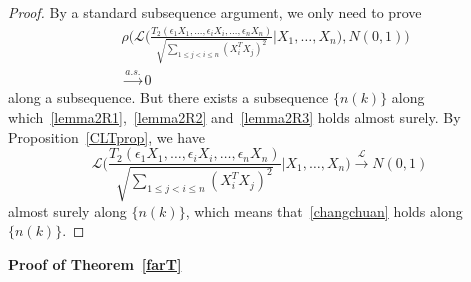 \documentclass[smallcondensed,final,natbib]{svjour3}          %
\begin{document}
\begin{proof}
By a standard subsequence argument, we only need to prove 
    \begin{equation}\label{changchuan}
        \begin{aligned}
            &\rho\Big(\mathcal{L}\Big(\frac{T_2(\epsilon_1 X_1,\ldots, \epsilon_i X_i,\ldots,\epsilon_n X_n)}{\sqrt{\sum_{1\leq j<i\leq n}{(X_i^T X_j)}^2}}\Big|X_1,\ldots,X_n\Big),N(0,1)\Big)\\
            &\xrightarrow{a.s.} 0
        \end{aligned}
    \end{equation}
     along a subsequence.
    But there exists a subsequence $\{n(k)\}$ along which~\eqref{lemma2R1},~\eqref{lemma2R2} and~\eqref{lemma2R3} holds almost surely.
    By Proposition~\ref{CLTprop}, we have
    \begin{equation*}
        \mathcal{L}\Big(\frac{T_2(\epsilon_1 X_1,\ldots, \epsilon_i X_i,\ldots,\epsilon_n X_n)}{\sqrt{\sum_{1\leq j<i\leq n}{(X_i^T X_j)}^2}}\Big|X_1,\ldots,X_n\Big)\xrightarrow{\mathcal{L}}N(0,1)
    \end{equation*}
    almost surely along $\{n(k)\}$, which means that~\eqref{changchuan} holds along $\{n(k)\}$.

\end{proof}


\textbf{Proof of Theorem~\ref{farT}}
\end{document}
